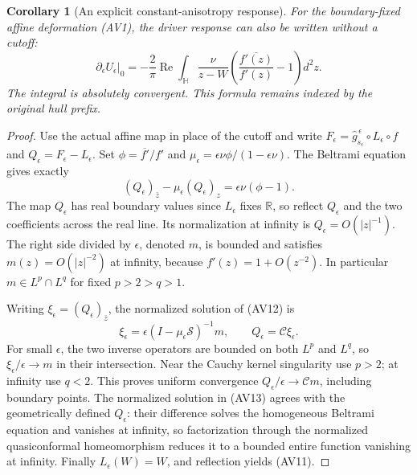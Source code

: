 \documentclass[11pt]{article}
\newtheorem{corollary}[theorem]{Corollary}
\theoremstyle{definition}\newtheorem{definition}[theorem]{Definition}
\theoremstyle{remark}\newtheorem{remark}[theorem]{Remark}
\begin{document}
\begin{corollary}[An explicit constant-anisotropy response]
\label{cor:affine-global-response}
For the boundary-fixed affine deformation (AV1), the driver response
can also be written without a cutoff:
\[
 \boxed{\left.\partial_\epsilon U_\epsilon\right|_0
 =-\frac2\pi\operatorname{Re}\int_{\mathbb H}
 \frac{\nu}{z-W}
 \left(\frac{\overline{f'(z)}}{f'(z)}-1\right)d^2z.}
 \tag{AV11}
\]
The integral is absolutely convergent. This formula remains indexed
by the original hull prefix.
\end{corollary}
\begin{proof}
Use the actual affine map in place of the cutoff and write
$F_\epsilon=\widehat g^{\,\epsilon}_{s_\epsilon}
\circ L_\epsilon\circ f$ and
$Q_\epsilon=F_\epsilon-L_\epsilon$. Set
$\phi=\overline{f'}/f'$ and
$\mu_\epsilon=\epsilon\nu\phi/(1-\epsilon\nu)$.
The Beltrami equation gives exactly
\[
 (Q_\epsilon)_{\bar z}
       -\mu_\epsilon(Q_\epsilon)_z
 =\epsilon\nu(\phi-1).
 \tag{AV12}
\]
The map $Q_\epsilon$ has real boundary values since $L_\epsilon$
fixes $\mathbb R$, so reflect $Q_\epsilon$ and the two coefficients
across the real line. Its normalization at infinity is
$Q_\epsilon=O(|z|^{-1})$. The right side divided by $\epsilon$,
denoted $m$, is bounded and satisfies $m(z)=O(|z|^{-2})$ at infinity,
because $f'(z)=1+O(z^{-2})$. In particular $m\in L^p\cap L^q$
for fixed $p>2>q>1$.

Writing $\xi_\epsilon=(Q_\epsilon)_{\bar z}$, the normalized
solution of (AV12) is
\[
 \xi_\epsilon=\epsilon(I-\mu_\epsilon\mathcal S)^{-1}m,
 \qquad Q_\epsilon=\mathcal C\xi_\epsilon.
 \tag{AV13}
\]
For small $\epsilon$, the two inverse operators are bounded on both
$L^p$ and $L^q$, so $\xi_\epsilon/\epsilon\to m$ in their
intersection. Near the Cauchy kernel singularity use $p>2$;
at infinity use $q<2$. This proves uniform convergence
$Q_\epsilon/\epsilon\to\mathcal Cm$, including boundary points.
The normalized solution in (AV13) agrees with the geometrically
defined $Q_\epsilon$: their difference solves the homogeneous
Beltrami equation and vanishes at infinity, so factorization through
the normalized quasiconformal homeomorphism reduces it to a bounded
entire function vanishing at infinity. Finally
$L_\epsilon(W)=W$, and reflection yields (AV11).
\end{proof}
\end{document}
